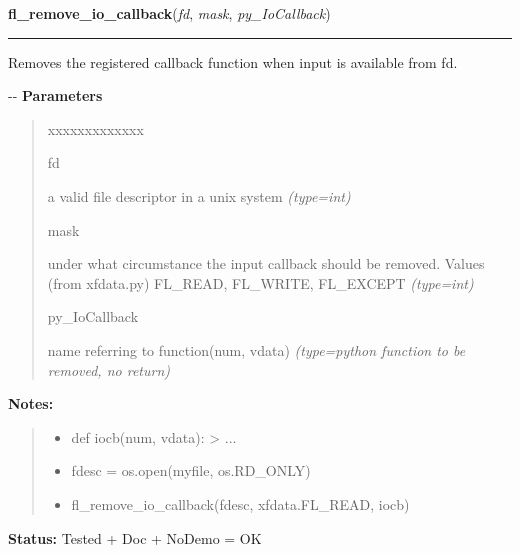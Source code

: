 \hspace{.8\funcindent}\begin{boxedminipage}{\funcwidth}

    \raggedright \textbf{fl\_remove\_io\_callback}(\textit{fd}, \textit{mask}, \textit{py\_IoCallback})

    \vspace{-1.5ex}

    \rule{\textwidth}{0.5\fboxrule}
\setlength{\parskip}{2ex}

Removes the registered callback function when input is available from
fd.

-{}-
\setlength{\parskip}{1ex}
      \textbf{Parameters}
      \vspace{-1ex}

      \begin{quote}
        \begin{Ventry}{xxxxxxxxxxxxx}

          \item[fd]


a valid file descriptor in a unix system
            {\it (type=int)}

          \item[mask]


under what circumstance the input callback should be removed. Values
(from xfdata.py) FL\_READ, FL\_WRITE, FL\_EXCEPT
            {\it (type=int)}

          \item[py\_IoCallback]


name referring to function(num, vdata)
            {\it (type=python function to be removed, no return)}

        \end{Ventry}

      \end{quote}

\textbf{Notes:}
\begin{quote}
  \begin{itemize}

  \item
    \setlength{\parskip}{0.6ex}

def iocb(num, vdata): > ...


  \item 
fdesc = os.open(myfile, os.RD\_ONLY)


  \item 
fl\_remove\_io\_callback(fdesc, xfdata.FL\_READ, iocb)


\end{itemize}

\end{quote}

\textbf{Status:} 
Tested + Doc + NoDemo = OK


    \end{boxedminipage}

